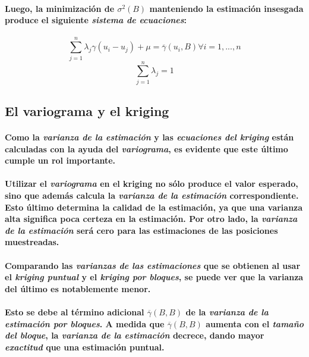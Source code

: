 \paragraph{
Luego, la minimización de $\sigma^2(B)$ manteniendo la estimación insesgada produce el siguiente \emph{sistema de ecuaciones}:
}
\begin{equation}
\sum_{j=1}^n \lambda_j \gamma(u_i - u_j) + \mu = \overline{\gamma}(u_i, B) \forall i = 1,...,n
\end{equation}
\begin{equation}
\sum_{j=1}^n \lambda_j = 1
\end{equation}


\subsection{El variograma y el kriging}
\paragraph{
Como la \emph{varianza de la estimación} y las \emph{ecuaciones del kriging} están calculadas con la ayuda del \emph{variograma}, es evidente que este último cumple un rol importante.
}
\paragraph{
Utilizar el \emph{variograma} en el kriging no sólo produce el valor esperado, sino que además calcula la \emph{varianza de la estimación} correspondiente. Esto último determina la calidad de la estimación, ya que una varianza alta significa poca certeza en la estimación. Por otro lado, la \emph{varianza de la estimación} será cero para las estimaciones de las posiciones muestreadas.
}
\paragraph{
Comparando las \emph{varianzas de las estimaciones} que se obtienen al usar el \emph{kriging puntual} y el \emph{kriging por bloques}, se puede ver que la varianza del último es notablemente menor.
}
\paragraph{
Esto se debe al término adicional $\overline{\gamma}(B,B)$ de la \emph{varianza de la estimación por bloques}. A medida que $\overline{\gamma}(B,B)$ aumenta con el \emph{tamaño del bloque}, la \emph{varianza de la estimación} decrece, dando mayor \emph{exactitud} que una estimación puntual.
}


